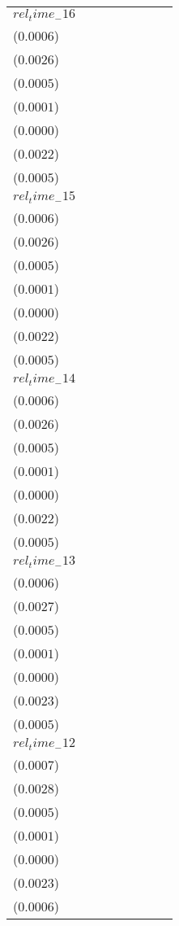 \begin{tabular}{llllllll}
$rel_time_-16$ & \makecell{$-0.0005^{}$ \\ ($0.0006$)} & \makecell{$-0.0047^{*}$ \\ ($0.0026$)} & \makecell{$0.0018^{***}$ \\ ($0.0005$)} & \makecell{$0.0004^{***}$ \\ ($0.0001$)} & \makecell{$0.0001^{***}$ \\ ($0.0000$)} & \makecell{$-0.0028^{}$ \\ ($0.0022$)} & \makecell{$0.0001^{}$ \\ ($0.0005$)} \\
$rel_time_-15$ & \makecell{$-0.0020^{***}$ \\ ($0.0006$)} & \makecell{$-0.0123^{***}$ \\ ($0.0026$)} & \makecell{$-0.0004^{}$ \\ ($0.0005$)} & \makecell{$0.0001^{}$ \\ ($0.0001$)} & \makecell{$-0.0000^{}$ \\ ($0.0000$)} & \makecell{$-0.0097^{***}$ \\ ($0.0022$)} & \makecell{$-0.0015^{***}$ \\ ($0.0005$)} \\
$rel_time_-14$ & \makecell{$-0.0026^{***}$ \\ ($0.0006$)} & \makecell{$-0.0128^{***}$ \\ ($0.0026$)} & \makecell{$-0.0005^{}$ \\ ($0.0005$)} & \makecell{$0.0000^{}$ \\ ($0.0001$)} & \makecell{$-0.0000^{}$ \\ ($0.0000$)} & \makecell{$-0.0093^{***}$ \\ ($0.0022$)} & \makecell{$-0.0018^{***}$ \\ ($0.0005$)} \\
$rel_time_-13$ & \makecell{$-0.0061^{***}$ \\ ($0.0006$)} & \makecell{$-0.0241^{***}$ \\ ($0.0027$)} & \makecell{$0.0006^{}$ \\ ($0.0005$)} & \makecell{$0.0001^{**}$ \\ ($0.0001$)} & \makecell{$0.0000^{}$ \\ ($0.0000$)} & \makecell{$-0.0191^{***}$ \\ ($0.0023$)} & \makecell{$-0.0046^{***}$ \\ ($0.0005$)} \\
$rel_time_-12$ & \makecell{$-0.0035^{***}$ \\ ($0.0007$)} & \makecell{$-0.0154^{***}$ \\ ($0.0028$)} & \makecell{$0.0008^{}$ \\ ($0.0005$)} & \makecell{$0.0001^{}$ \\ ($0.0001$)} & \makecell{$0.0000^{}$ \\ ($0.0000$)} & \makecell{$-0.0112^{***}$ \\ ($0.0023$)} & \makecell{$-0.0026^{***}$ \\ ($0.0006$)} \\

\end{tabular}
